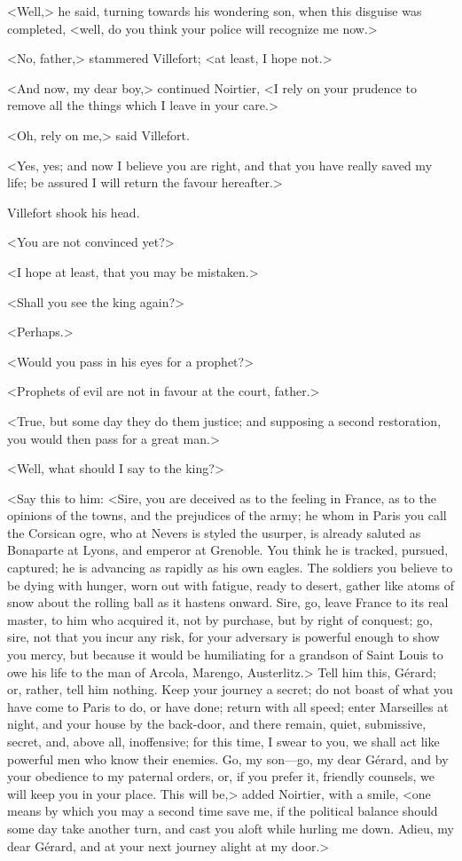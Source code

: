  <Well,> he said, turning towards his wondering son, when this disguise was completed, <well, do you think your police will recognize me now.> 

 <No, father,> stammered Villefort; <at least, I hope not.> 

 <And now, my dear boy,> continued Noirtier, <I rely on your prudence to remove all the things which I leave in your care.> 

 <Oh, rely on me,> said Villefort. 

 <Yes, yes; and now I believe you are right, and that you have really saved my life; be assured I will return the favour hereafter.> 

 Villefort shook his head. 

 <You are not convinced yet?> 

 <I hope at least, that you may be mistaken.> 

 <Shall you see the king again?> 

 <Perhaps.> 

 <Would you pass in his eyes for a prophet?> 

 <Prophets of evil are not in favour at the court, father.> 

 <True, but some day they do them justice; and supposing a second restoration, you would then pass for a great man.> 

 <Well, what should I say to the king?> 

 <Say this to him: <Sire, you are deceived as to the feeling in France, as to the opinions of the towns, and the prejudices of the army; he whom in Paris you call the Corsican ogre, who at Nevers is styled the usurper, is already saluted as Bonaparte at Lyons, and emperor at Grenoble. You think he is tracked, pursued, captured; he is advancing as rapidly as his own eagles. The soldiers you believe to be dying with hunger, worn out with fatigue, ready to desert, gather like atoms of snow about the rolling ball as it hastens onward. Sire, go, leave France to its real master, to him who acquired it, not by purchase, but by right of conquest; go, sire, not that you incur any risk, for your adversary is powerful enough to show you mercy, but because it would be humiliating for a grandson of Saint Louis to owe his life to the man of Arcola, Marengo, Austerlitz.> Tell him this, Gérard; or, rather, tell him nothing. Keep your journey a secret; do not boast of what you have come to Paris to do, or have done; return with all speed; enter Marseilles at night, and your house by the back-door, and there remain, quiet, submissive, secret, and, above all, inoffensive; for this time, I swear to you, we shall act like powerful men who know their enemies. Go, my son—go, my dear Gérard, and by your obedience to my paternal orders, or, if you prefer it, friendly counsels, we will keep you in your place. This will be,> added Noirtier, with a smile, <one means by which you may a second time save me, if the political balance should some day take another turn, and cast you aloft while hurling me down. Adieu, my dear Gérard, and at your next journey alight at my door.> 


